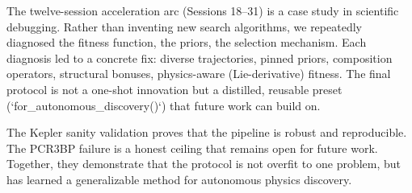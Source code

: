 The twelve-session acceleration arc (Sessions 18--31) is a case study in scientific debugging. Rather than inventing new search algorithms, we repeatedly diagnosed the fitness function, the priors, the selection mechanism. Each diagnosis led to a concrete fix: diverse trajectories, pinned priors, composition operators, structural bonuses, physics-aware (Lie-derivative) fitness. The final protocol is not a one-shot innovation but a distilled, reusable preset (`for_autonomous_discovery()`) that future work can build on.

The Kepler sanity validation proves that the pipeline is robust and reproducible. The PCR3BP failure is a honest ceiling that remains open for future work. Together, they demonstrate that the protocol is not overfit to one problem, but has learned a generalizable method for autonomous physics discovery.


